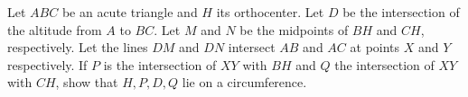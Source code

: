 Let $ABC$ be an acute triangle and $H$ its orthocenter. Let $D$ be the intersection of the altitude from $A$ to $BC$. Let $M$ and $N$ be the midpoints of $BH$ and $CH$,  respectively. Let the lines $DM$ and $DN$ intersect $AB$ and $AC$ at points $X$ and $Y$ respectively. If $P$ is the intersection of $XY$ with $BH$ and $Q$ the intersection of $XY$ with $CH$,  show that $H, P, D, Q$ lie on a circumference.